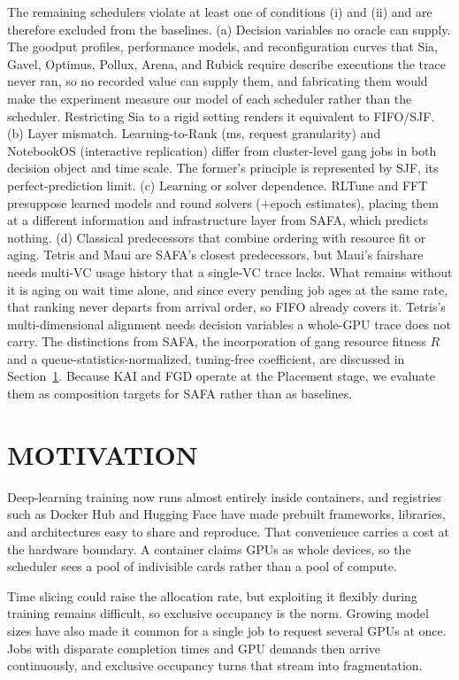 \documentclass{ieeetj}
\begin{document}
The remaining schedulers violate at least one of conditions (i) and (ii) and are therefore excluded from the baselines. (a) Decision variables no oracle can supply. The goodput profiles, performance models, and reconfiguration curves that Sia, Gavel\cite{narayanan2020gavel}, Optimus, Pollux, Arena, and Rubick require describe executions the trace never ran, so no recorded value can supply them, and fabricating them would make the experiment measure our model of each scheduler rather than the scheduler. Restricting Sia to a rigid setting renders it equivalent to FIFO/SJF. (b) Layer mismatch. Learning-to-Rank (ms, request granularity) and NotebookOS (interactive replication) differ from cluster-level gang jobs in both decision object and time scale. The former's principle is represented by SJF, its perfect-prediction limit. (c) Learning or solver dependence. RLTune and FFT presuppose learned models and round solvers ($+$epoch estimates), placing them at a different information and infrastructure layer from SAFA, which predicts nothing. (d) Classical predecessors that combine ordering with resource fit or aging. Tetris\cite{grandl2014multi} and Maui\cite{jackson2001maui} are SAFA's closest predecessors, but Maui's fairshare needs multi-VC usage history that a single-VC trace lacks. What remains without it is aging on wait time alone, and since every pending job ages at the same rate, that ranking never departs from arrival order, so FIFO already covers it. Tetris's multi-dimensional alignment needs decision variables a whole-GPU trace does not carry. The distinctions from SAFA, the incorporation of gang resource fitness $R$ and a queue-statistics-normalized, tuning-free coefficient, are discussed in Section~\ref{motivation}. Because KAI and FGD operate at the Placement stage, we evaluate them as composition targets for SAFA rather than as baselines.

\section{MOTIVATION}\label{motivation}
Deep-learning training now runs almost entirely inside containers\cite{b7}, and registries such as Docker Hub\cite{b8} and Hugging Face\cite{b9} have made prebuilt frameworks, libraries, and architectures easy to share and reproduce. That convenience carries a cost at the hardware boundary. A container claims GPUs as whole devices, so the scheduler sees a pool of indivisible cards rather than a pool of compute.

Time slicing could raise the allocation rate, but exploiting it flexibly during training remains difficult, so exclusive occupancy is the norm. Growing model sizes have also made it common for a single job to request several GPUs at once. Jobs with disparate completion times and GPU demands then arrive continuously, and exclusive occupancy turns that stream into fragmentation.
\end{document}
